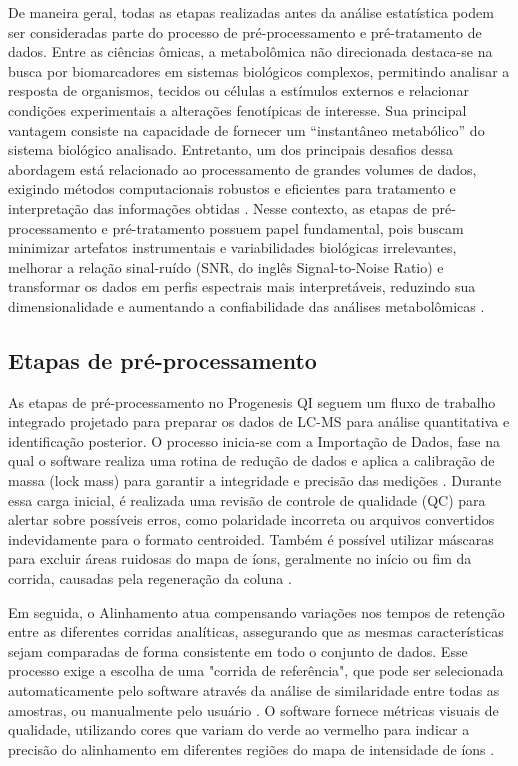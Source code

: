 De maneira geral, todas as etapas realizadas antes da análise estatística podem ser consideradas parte do processo de pré-processamento e pré-tratamento de dados. Entre as ciências ômicas, a metabolômica não direcionada destaca-se na busca por biomarcadores em sistemas biológicos complexos, permitindo analisar a resposta de organismos, tecidos ou células a estímulos externos e relacionar condições experimentais a alterações fenotípicas de interesse. Sua principal vantagem consiste na capacidade de fornecer um “instantâneo metabólico” do sistema biológico analisado. Entretanto, um dos principais desafios dessa abordagem está relacionado ao processamento de grandes volumes de dados, exigindo métodos computacionais robustos e eficientes para tratamento e interpretação das informações obtidas \cite{MARTIN20181}. Nesse contexto, as etapas de pré-processamento e pré-tratamento possuem papel fundamental, pois buscam minimizar artefatos instrumentais e variabilidades biológicas irrelevantes, melhorar a relação sinal-ruído (SNR, do inglês Signal-to-Noise Ratio) e transformar os dados em perfis espectrais mais interpretáveis, reduzindo sua dimensionalidade e aumentando a confiabilidade das análises metabolômicas \cite{sun2024pretreating}.

\subsection{Etapas de pré-processamento}

As etapas de pré-processamento no Progenesis QI seguem um fluxo de trabalho integrado projetado para preparar os dados de LC-MS para análise quantitativa e identificação posterior. O processo inicia-se com a Importação de Dados, fase na qual o software realiza uma rotina de redução de dados e aplica a calibração de massa (lock mass) para garantir a integridade e precisão das medições \cite{watersprogenesisguide}. Durante essa carga inicial, é realizada uma revisão de controle de qualidade (QC) para alertar sobre possíveis erros, como polaridade incorreta ou arquivos convertidos indevidamente para o formato centroided. Também é possível utilizar máscaras para excluir áreas ruidosas do mapa de íons, geralmente no início ou fim da corrida, causadas pela regeneração da coluna \cite{watersprogenesisguide}.

Em seguida, o Alinhamento atua compensando variações nos tempos de retenção entre as diferentes corridas analíticas, assegurando que as mesmas características sejam comparadas de forma consistente em todo o conjunto de dados. Esse processo exige a escolha de uma "corrida de referência", que pode ser selecionada automaticamente pelo software através da análise de similaridade entre todas as amostras, ou manualmente pelo usuário \cite{watersprogenesisguide}. O software fornece métricas visuais de qualidade, utilizando cores que variam do verde ao vermelho para indicar a precisão do alinhamento em diferentes regiões do mapa de intensidade de íons \cite{watersprogenesisguide}.

